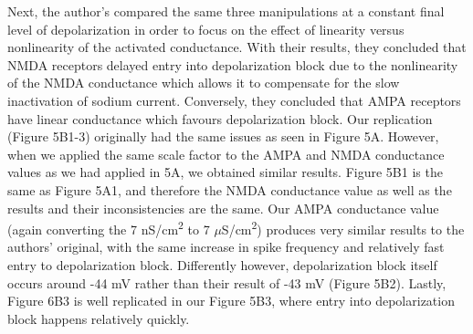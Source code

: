 Next, the author’s compared the same three manipulations at a constant final level of depolarization in order to focus on the effect of linearity versus nonlinearity of the activated conductance. With their results, they concluded that NMDA receptors delayed entry into depolarization block due to the nonlinearity of the NMDA conductance which allows it to compensate for the slow inactivation of sodium current. Conversely, they concluded that AMPA receptors have linear conductance which favours depolarization block.  Our replication (Figure 5B1-3) originally had the same issues as seen in Figure 5A. However, when we applied the same scale factor to the AMPA and NMDA conductance values as we had applied in 5A, we obtained similar results. Figure 5B1 is the same as Figure 5A1, and therefore the NMDA conductance value as well as the results and their inconsistencies are the same. Our AMPA conductance value (again converting the 7 nS/cm\textsuperscript{2} to 7 $\mu$S/cm\textsuperscript{2}) produces very similar results to the authors' original, with the same increase in spike frequency and relatively fast entry to depolarization block. Differently however, depolarization block itself occurs around -44 mV rather than their result of -43 mV (Figure 5B2). Lastly, Figure 6B3 is well replicated in our Figure 5B3, where entry into depolarization block happens relatively quickly.

